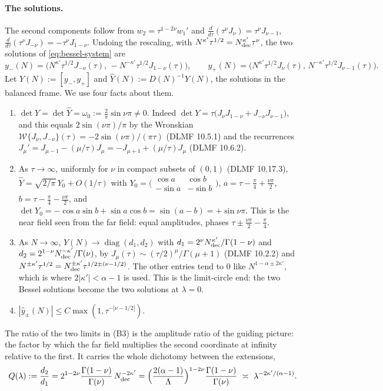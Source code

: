 \paragraph{The solutions.} The second components follow from $w_2=\tau^{1-2\nu}w_1'$ and
$\frac{d}{d\tau}(\tau^\nu J_\nu)=\tau^\nu J_{\nu-1}$, $\frac{d}{d\tau}(\tau^\nu J_{-\nu})=-\tau^\nu J_{1-\nu}$.
Undoing the rescaling, with $N^{\kappa'}\tau^{1/2}=N_{\rm dec}^{\kappa'}\tau^{\nu}$, the two solutions of
\eqref{eq:bessel-system} are
\[
  y_-(N)=\bigl(N^{\kappa'}\tau^{1/2}J_{-\nu}(\tau),\,-N^{-\kappa'}\tau^{1/2}J_{1-\nu}(\tau)\bigr),\qquad
  y_+(N)=\bigl(N^{\kappa'}\tau^{1/2}J_{\nu}(\tau),\,N^{-\kappa'}\tau^{1/2}J_{\nu-1}(\tau)\bigr).
\]
Let $Y(N):=[y_-,y_+]$ and $\hat Y(N):=D(N)^{-1}Y(N)$, the solutions in the balanced frame.
We use four facts about them.
\begin{enumerate}
\item[(B1)] $\det Y=\det\hat Y=\omega_0:=\frac2\pi\sin\nu\pi\neq0$. Indeed
  $\det Y=\tau\bigl(J_\nu J_{1-\nu}+J_{-\nu}J_{\nu-1}\bigr)$, and this equals $2\sin(\nu\pi)/\pi$ by the
  Wronskian $\mathscr W\{J_\nu,J_{-\nu}\}(\tau)=-2\sin(\nu\pi)/(\pi\tau)$ (DLMF 10.5.1) and the recurrences
  $J_\mu'=J_{\mu-1}-(\mu/\tau)J_\mu=-J_{\mu+1}+(\mu/\tau)J_\mu$ (DLMF 10.6.2).
\item[(B2)] As $\tau\to\infty$, uniformly for $\nu$ in compact subsets of $(0,1)$ (DLMF 10.17.3),
  $\hat Y=\sqrt{2/\pi}\,Y_0+O(1/\tau)$ with
  $Y_0=\bigl(\begin{smallmatrix}\cos a&\cos b\\-\sin a&-\sin b\end{smallmatrix}\bigr)$,
  $a=\tau-\frac\pi4+\frac{\nu\pi}2$, $b=\tau-\frac\pi4-\frac{\nu\pi}2$, and
  $\det Y_0=-\cos a\sin b+\sin a\cos b=\sin(a-b)=+\sin\nu\pi$. This is the near field seen from the far field:
  equal amplitudes, phases $\tau\pm\frac{\nu\pi}2-\frac\pi4$.
\item[(B3)] As $N\to\infty$, $Y(N)\to\operatorname{diag}(d_1,d_2)$ with
  $d_1=2^\nu N_{\rm dec}^{\kappa'}/\Gamma(1-\nu)$ and $d_2=2^{1-\nu}N_{\rm dec}^{-\kappa'}/\Gamma(\nu)$, by
  $J_\mu(\tau)\sim(\tau/2)^\mu/\Gamma(\mu+1)$ (DLMF 10.2.2) and $N^{\pm\kappa'}\tau^{1/2}=N_{\rm dec}^{\pm\kappa'}\tau^{1/2\pm(\nu-1/2)}$. The other entries tend to $0$ like $N^{1-\alpha\pm2\kappa'}$, which is where
  $2|\kappa'|<\alpha-1$ is used. This is the limit-circle end: the two Bessel solutions become the
  two solutions at $\lambda=0$.
\item[(B4)] $|\hat y_\pm(N)|\le C\max(1,\tau^{-|\nu-1/2|})$.
\end{enumerate}
The ratio of the two limits in (B3) is the amplitude ratio of the guiding picture: the factor by
which the far field multiplies the second coordinate at infinity relative to the first. It carries
the whole dichotomy between the extensions,
\begin{equation}\label{eq:Q}
  Q(\lambda):=\frac{d_2}{d_1}=2^{1-2\nu}\frac{\Gamma(1-\nu)}{\Gamma(\nu)}\,N_{\rm dec}^{-2\kappa'}
  =\Bigl(\frac{2(\alpha-1)}{\Lambda}\Bigr)^{1-2\nu}\frac{\Gamma(1-\nu)}{\Gamma(\nu)}
  \ \asymp\ \lambda^{-2\kappa'/(\alpha-1)} .
\end{equation}


